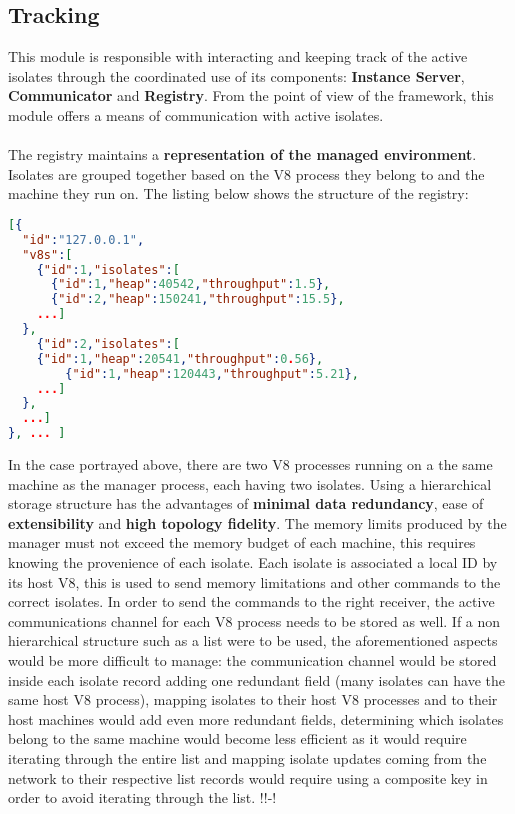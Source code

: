 \documentclass{l4proj}
\begin{document}
\subsection{Tracking} \label{Design:Tracking}
\hspace*{3em} This module is responsible with interacting and keeping track of the active isolates through the coordinated use of its components: \textbf{Instance Server}, \textbf{Communicator} and \textbf{Registry}. From the point of view of the framework, this module offers a means of communication with active isolates.
\\\\ %
\hspace*{3em} The registry maintains a \textbf{representation of the managed environment}. Isolates are grouped together based on the V8 process they belong to and the machine they run on. The listing below shows the structure of the registry:
\begin{lstlisting}[language=json,firstnumber=1]
[{
  "id":"127.0.0.1",
  "v8s":[
    {"id":1,"isolates":[
      {"id":1,"heap":40542,"throughput":1.5},
      {"id":2,"heap":150241,"throughput":15.5},
    ...]
  },
    {"id":2,"isolates":[
    {"id":1,"heap":20541,"throughput":0.56},
        {"id":1,"heap":120443,"throughput":5.21},
    ...]
  },
  ...]
}, ... ]
\end{lstlisting}
In the case portrayed above, there are two V8 processes running on a the same machine as the manager process, each having two isolates. Using a hierarchical storage structure has the advantages of \textbf{minimal data redundancy}, ease of \textbf{extensibility} and \textbf{high topology fidelity}. The memory limits produced by the manager must not exceed the memory budget of each machine, this requires knowing the provenience of each isolate. Each isolate is associated a local ID by its host V8, this is used to send memory limitations and other commands to the correct isolates. In order to send the commands to the right receiver, the active communications channel for each V8 process needs to be stored as well. If a non hierarchical structure such as a list were to be used, the aforementioned aspects would be more difficult to manage: the communication channel would be stored inside each isolate record adding one redundant field (many isolates can have the same host V8 process), mapping isolates to their host V8 processes and to their host machines would add even more redundant fields, determining which isolates belong to the same machine would become less efficient as it would require iterating through the entire list and mapping isolate updates coming from the network to their respective list records would require using a composite key in order to avoid iterating through the list. !!-!
\end{document}
